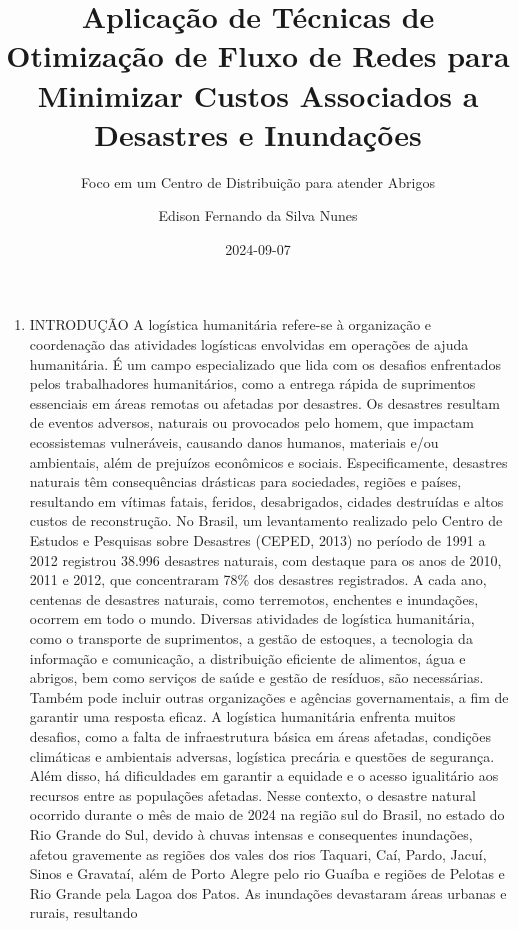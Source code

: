 \documentclass[
]{article}
\title{Aplicação de Técnicas de Otimização de Fluxo de Redes para
Minimizar Custos Associados a Desastres e Inundações}
\subtitle{Foco em um Centro de Distribuição para atender Abrigos}
\author{Edison Fernando da Silva Nunes}
\date{2024-09-07}
\begin{document}
\maketitle

\begin{enumerate}
\def\labelenumi{\arabic{enumi}.}
\item
  INTRODUÇÃO A logística humanitária refere-se à organização e
  coordenação das atividades logísticas envolvidas em operações de ajuda
  humanitária. É um campo especializado que lida com os desafios
  enfrentados pelos trabalhadores humanitários, como a entrega rápida de
  suprimentos essenciais em áreas remotas ou afetadas por desastres. Os
  desastres resultam de eventos adversos, naturais ou provocados pelo
  homem, que impactam ecossistemas vulneráveis, causando danos humanos,
  materiais e/ou ambientais, além de prejuízos econômicos e sociais.
  Especificamente, desastres naturais têm consequências drásticas para
  sociedades, regiões e países, resultando em vítimas fatais, feridos,
  desabrigados, cidades destruídas e altos custos de reconstrução. No
  Brasil, um levantamento realizado pelo Centro de Estudos e Pesquisas
  sobre Desastres (CEPED, 2013) no período de 1991 a 2012 registrou
  38.996 desastres naturais, com destaque para os anos de 2010, 2011 e
  2012, que concentraram 78\% dos desastres registrados. A cada ano,
  centenas de desastres naturais, como terremotos, enchentes e
  inundações, ocorrem em todo o mundo. Diversas atividades de logística
  humanitária, como o transporte de suprimentos, a gestão de estoques, a
  tecnologia da informação e comunicação, a distribuição eficiente de
  alimentos, água e abrigos, bem como serviços de saúde e gestão de
  resíduos, são necessárias. Também pode incluir outras organizações e
  agências governamentais, a fim de garantir uma resposta eficaz. A
  logística humanitária enfrenta muitos desafios, como a falta de
  infraestrutura básica em áreas afetadas, condições climáticas e
  ambientais adversas, logística precária e questões de segurança. Além
  disso, há dificuldades em garantir a equidade e o acesso igualitário
  aos recursos entre as populações afetadas. Nesse contexto, o desastre
  natural ocorrido durante o mês de maio de 2024 na região sul do
  Brasil, no estado do Rio Grande do Sul, devido à chuvas intensas e
  consequentes inundações, afetou gravemente as regiões dos vales dos
  rios Taquari, Caí, Pardo, Jacuí, Sinos e Gravataí, além de Porto
  Alegre pelo rio Guaíba e regiões de Pelotas e Rio Grande pela Lagoa
  dos Patos. As inundações devastaram áreas urbanas e rurais, resultando

\end{enumerate}
\end{document}
